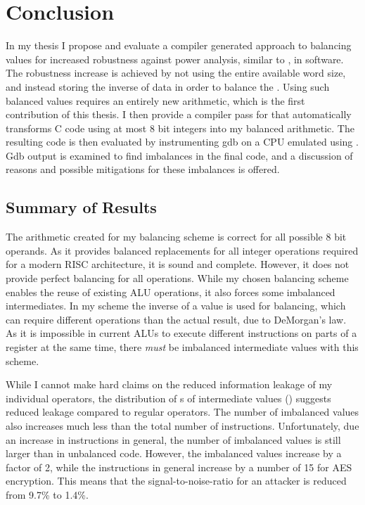 \chapter{Conclusion}
\label{conclusion}
In my thesis I propose and evaluate a compiler generated approach to balancing values for increased robustness against power analysis, similar to \dual{}, in software.
The robustness increase is achieved by not using the entire available word size, and instead storing the inverse of data in order to balance the \hammingw{}.
Using such balanced values requires an entirely new arithmetic, which is the first contribution of this thesis.
I then provide a compiler pass for \llvm{} that automatically transforms C code using at most 8 bit integers into my balanced arithmetic.
The resulting code is then evaluated by instrumenting gdb on a CPU emulated using \qemu{}.
Gdb output is examined to find imbalances in the final code, and a discussion of reasons and possible mitigations for these imbalances is offered.

\section{Summary of Results}
The arithmetic created for my balancing scheme is correct for all possible 8 bit operands.
As it provides balanced replacements for all integer operations required for a modern RISC architecture, it is sound and complete.
However, it does not provide perfect balancing for all operations.
While my chosen balancing scheme enables the reuse of existing ALU operations, it also forces some imbalanced intermediates.
In my scheme the inverse of a value is used for balancing, which can require different operations than the actual result, due to DeMorgan's law.
As it is impossible in current ALUs to execute different instructions on parts of a register at the same time, there \emph{must} be imbalanced intermediate values with this scheme.

While I cannot make hard claims on the reduced information leakage of my individual operators, the distribution of \hammingw{}s of intermediate values () suggests reduced leakage compared to regular operators.
The number of imbalanced values also increases much less than the total number of instructions.
Unfortunately, due an increase in instructions in general, the number of imbalanced values is still larger than in unbalanced code.
However, the imbalanced values increase by a factor of 2, while the instructions in general increase by a number of 15 for AES encryption.
This means that the signal-to-noise-ratio for an attacker is reduced from 9.7\% to 1.4\%.

